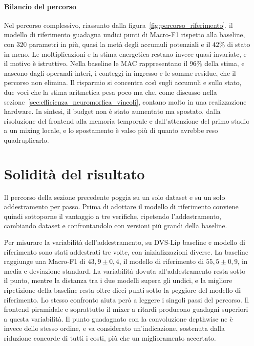 \paragraph{Bilancio del percorso}
Nel percorso complessivo, riassunto dalla figura~\ref{fig:percorso_riferimento}, il modello di riferimento guadagna undici punti di Macro-F1 rispetto alla baseline, con 320 parametri in più, quasi la metà degli accumuli potenziali e il $42\%$ di stato in meno. Le moltiplicazioni e la stima energetica restano invece quasi invariate, e il motivo è istruttivo. Nella baseline le MAC rappresentano il $96\%$ della stima, e nascono dagli operandi interi, i conteggi in ingresso e le somme residue, che il percorso non elimina. Il risparmio si concentra così sugli accumuli e sullo stato, due voci che la stima aritmetica pesa poco ma che, come discusso nella sezione~\ref{sec:efficienza_neuromorfica_vincoli}, contano molto in una realizzazione hardware. In sintesi, il budget non è stato aumentato ma spostato, dalla risoluzione del frontend alla memoria temporale e dall'attenzione del primo stadio a un mixing locale, e lo spostamento è valso più di quanto avrebbe reso quadruplicarlo.



\section{Solidità del risultato}
\label{sec:solidita_riferimento}

Il percorso della sezione precedente poggia su un solo dataset e su un solo addestramento per passo. Prima di adottare il modello di riferimento conviene quindi sottoporne il vantaggio a tre verifiche, ripetendo l'addestramento, cambiando dataset e confrontandolo con versioni più grandi della baseline.

Per misurare la variabilità dell'addestramento, su DVS-Lip baseline e modello di riferimento sono stati addestrati tre volte, con inizializzazioni diverse. La baseline raggiunge una Macro-F1 di $43{,}9\pm0{,}4$, il modello di riferimento di $55{,}5\pm0{,}9$, in media e deviazione standard. La variabilità dovuta all'addestramento resta sotto il punto, mentre la distanza tra i due modelli supera gli undici, e la migliore ripetizione della baseline resta oltre dieci punti sotto la peggiore del modello di riferimento. Lo stesso confronto aiuta però a leggere i singoli passi del percorso. Il frontend piramidale e soprattutto il mixer a ritardi producono guadagni superiori a questa variabilità. Il punto guadagnato con la convoluzione depthwise ne è invece dello stesso ordine, e va considerato un'indicazione, sostenuta dalla riduzione concorde di tutti i costi, più che un miglioramento accertato.

